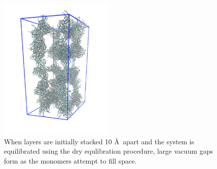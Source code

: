 \documentclass{article}
\begin{document}
\begin{enumerate}
	  \begin{figure}
		\centering
		\includegraphics[width=0.5\textwidth]{dbwl_10.png}
		\caption{When layers are initially stacked 10 \AA~apart and the system
                is equilibrated using the dry equlibration procedure, large vacuum gaps
		form as the monomers attempt to fill space.}\label{fig:dbwl_10} 
	  \end{figure}

  \end{enumerate}
\end{document}
